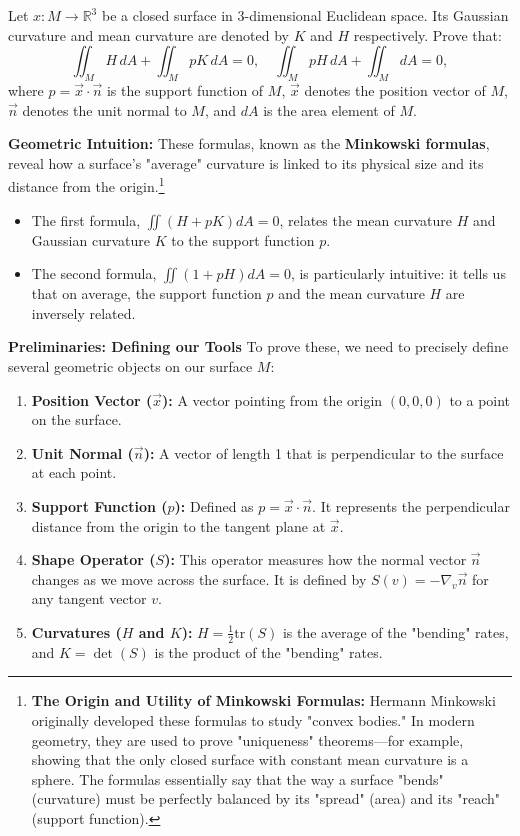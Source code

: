 \clearpage

\begin{exercise}
\label{geometry:2012:5}
Let $x : M \to \mathbb{R}^{3}$ be a closed surface in 3-dimensional Euclidean space. Its Gaussian curvature and mean curvature are denoted by $K$ and $H$ respectively. Prove that:
\[ \iint_{M} H\, dA + \iint_{M} pK\, dA = 0, \quad \iint_{M} pH\, dA + \iint_{M} dA = 0, \]
where $p = \vec{x} \cdot \vec{n}$ is the support function of $M$, $\vec{x}$ denotes the position vector of $M$, $\vec{n}$ denotes the unit normal to $M$, and $dA$ is the area element of $M$.
\end{exercise}

\begin{solution}
\textbf{Geometric Intuition:} These formulas, known as the \textbf{Minkowski formulas}, reveal how a surface's "average" curvature is linked to its physical size and its distance from the origin.\footnote{\textbf{The Origin and Utility of Minkowski Formulas:} Hermann Minkowski originally developed these formulas to study "convex bodies." In modern geometry, they are used to prove "uniqueness" theorems—for example, showing that the only closed surface with constant mean curvature is a sphere. The formulas essentially say that the way a surface "bends" (curvature) must be perfectly balanced by its "spread" (area) and its "reach" (support function).}
\begin{itemize}
    \item The first formula, $\iint (H + pK) dA = 0$, relates the mean curvature $H$ and Gaussian curvature $K$ to the support function $p$.
    \item The second formula, $\iint (1 + pH) dA = 0$, is particularly intuitive: it tells us that on average, the support function $p$ and the mean curvature $H$ are inversely related.
\end{itemize}

\textbf{Preliminaries: Defining our Tools}
To prove these, we need to precisely define several geometric objects on our surface $M$:
\begin{enumerate}
    \item \textbf{Position Vector ($\vec{x}$):} A vector pointing from the origin $(0,0,0)$ to a point on the surface.
    \item \textbf{Unit Normal ($\vec{n}$):} A vector of length 1 that is perpendicular to the surface at each point.
    \item \textbf{Support Function ($p$):} Defined as $p = \vec{x} \cdot \vec{n}$. It represents the perpendicular distance from the origin to the tangent plane at $\vec{x}$.
    \item \textbf{Shape Operator ($S$):} This operator measures how the normal vector $\vec{n}$ changes as we move across the surface. It is defined by $S(v) = -\nabla_v \vec{n}$ for any tangent vector $v$.
    \item \textbf{Curvatures ($H$ and $K$):} $H = \frac{1}{2}\text{tr}(S)$ is the average of the "bending" rates, and $K = \det(S)$ is the product of the "bending" rates.
\end{enumerate}


\end{solution}
